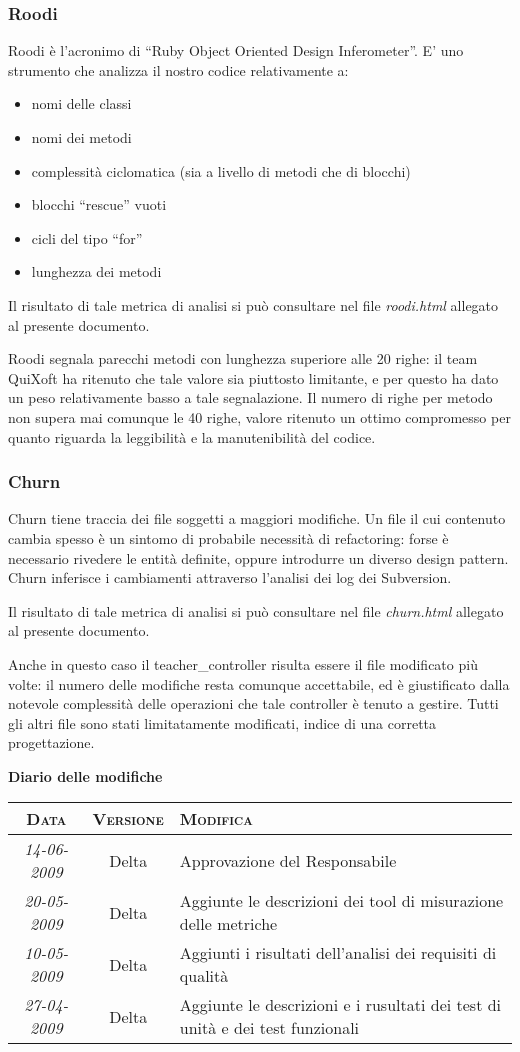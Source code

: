 \documentclass[11pt,a4paper]{article}
\newcommand{\modifiche} 
{
\newpage
\begin{center}
\textbf{Diario delle modifiche} \\
\bigskip
\begin{tabular}{|c|c|p{0.61\textwidth}|}
\hline
\textsc{Data} & \textsc{Versione} & \textsc{Modifica} \\
\hline
\hline
\textit{14-06-2009} & Delta & Approvazione del Responsabile \\
\hline
\textit{20-05-2009} & Delta & Aggiunte le descrizioni dei tool di misurazione delle metriche  \\
\hline
\textit{10-05-2009} & Delta & Aggiunti i risultati dell'analisi dei requisiti di qualità  \\
\hline
\textit{27-04-2009} & Delta & Aggiunte le descrizioni e i rusultati dei test di unità e dei test funzionali  \\
\hline
\end{tabular}
\end{center}
}
\begin{document}
\subsubsection{Roodi}
Roodi è l’acronimo di “Ruby Object Oriented Design Inferometer”. E’ uno strumento che analizza il nostro codice relativamente a:
\begin{itemize}
 \item nomi delle classi
 \item nomi dei metodi
 \item complessità ciclomatica (sia a livello di metodi che di blocchi)
 \item blocchi “rescue” vuoti
 \item cicli del tipo “for”
 \item lunghezza dei metodi
\end{itemize}
Il risultato di tale metrica di analisi si può consultare nel file \textit{roodi.html} allegato al presente documento.

Roodi segnala parecchi metodi con lunghezza superiore alle 20 righe: il team QuiXoft ha ritenuto che tale valore sia piuttosto limitante, e per questo ha dato un peso relativamente basso a tale segnalazione. Il numero di righe per metodo non supera mai comunque le 40 righe, valore ritenuto un ottimo compromesso per quanto riguarda la leggibilità e la manutenibilità del codice.
\subsubsection{Churn}
Churn tiene traccia dei file soggetti a maggiori modifiche. Un file il cui contenuto cambia spesso è un sintomo di probabile necessità di refactoring: forse è necessario rivedere le entità definite, oppure introdurre un diverso design pattern.
Churn inferisce i cambiamenti attraverso l’analisi dei log dei Subversion.

Il risultato di tale metrica di analisi si può consultare nel file \textit{churn.html} allegato al presente documento.

Anche in questo caso il teacher\_controller risulta essere il file modificato più volte: il numero delle modifiche resta comunque accettabile, ed è giustificato dalla notevole complessità delle operazioni che tale controller è tenuto a gestire.
Tutti gli altri file sono stati limitatamente modificati, indice di una corretta progettazione.
\modifiche
\end{document}
